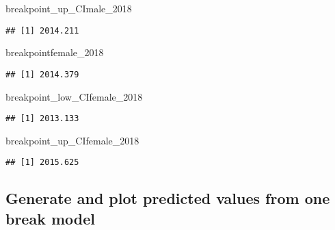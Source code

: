 \documentclass[]{article}
\newenvironment{Shaded}{\begin{snugshade}}{\end{snugshade}}
\newcommand{\DecValTok}[1]{\textcolor[rgb]{0.00,0.00,0.81}{#1}}
\newcommand{\NormalTok}[1]{#1}
\begin{document}
\begin{Shaded}
\begin{Highlighting}[]
\NormalTok{breakpoint_up_CImale_}\DecValTok{2018}
\end{Highlighting}
\end{Shaded}

\begin{verbatim}
## [1] 2014.211
\end{verbatim}

\begin{Shaded}
\begin{Highlighting}[]
\NormalTok{breakpointfemale_}\DecValTok{2018}
\end{Highlighting}
\end{Shaded}

\begin{verbatim}
## [1] 2014.379
\end{verbatim}

\begin{Shaded}
\begin{Highlighting}[]
\NormalTok{breakpoint_low_CIfemale_}\DecValTok{2018}
\end{Highlighting}
\end{Shaded}

\begin{verbatim}
## [1] 2013.133
\end{verbatim}

\begin{Shaded}
\begin{Highlighting}[]
\NormalTok{breakpoint_up_CIfemale_}\DecValTok{2018}
\end{Highlighting}
\end{Shaded}

\begin{verbatim}
## [1] 2015.625
\end{verbatim}

\subsection{Generate and plot predicted values from one break
model}\label{generate-and-plot-predicted-values-from-one-break-model}
\end{document}
